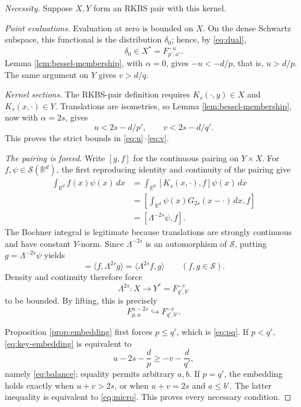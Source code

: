 \documentclass[11pt]{article}
\newcommand{\R}{\mathbb R}
\newcommand{\Sch}{\mathcal S}
\newcommand{\Fsp}[3]{F^{#1}_{#2,#3}}
\newcommand{\Lambdaop}{\Lambda}
\newcommand{\ip}[2]{\langle #1,#2\rangle}
\begin{document}
\begin{proof}[Necessity]
Suppose $X,Y$ form an RKBS pair with this kernel.

\emph{Point evaluations.}
Evaluation at zero is bounded on $X$.  On the dense Schwartz subspace,
this functional is the distribution $\delta_0$; hence, by
\eqref{eq:dual},
\[
  \delta_0\in X^*=\Fsp{-u}{p'}{a'}.
\]
Lemma \ref{lem:bessel-membership}, with $\alpha=0$, gives
$-u<-d/p$, that is, $u>d/p$.  The same argument on $Y$ gives
$v>d/q$.

\emph{Kernel sections.}
The RKBS-pair definition requires
$K_s(\cdot,y)\in X$ and $K_s(x,\cdot)\in Y$.  Translations are
isometries, so Lemma \ref{lem:bessel-membership}, now with
$\alpha=2s$, gives
\[
  u<2s-d/p',
  \qquad v<2s-d/q'.
\]
This proves the strict bounds in \eqref{eq:u}--\eqref{eq:v}.

\emph{The pairing is forced.}
Write $[g,f]$ for the continuous pairing on $Y\times X$.  For
$f,\psi\in\Sch(\R^d)$, the first reproducing identity and continuity of
the pairing give
\begin{align*}
  \int_{\R^d} f(x)\psi(x)\,dx
  &=\int_{\R^d}[K_s(x,\cdot),f]\psi(x)\,dx\\
  &=\left[\int_{\R^d}\psi(x)G_{2s}(x-\cdot)\,dx,f\right]\\
  &=[\Lambdaop^{-2s}\psi,f].
\end{align*}
The Bochner integral is legitimate because translations are strongly
continuous and have constant $Y$-norm.  Since
$\Lambdaop^{-2s}$ is an automorphism of $\Sch$, putting
$g=\Lambdaop^{-2s}\psi$ yields
\begin{equation}
  [g,f]=\ip{f}{\Lambdaop^{2s}g}
  =\ip{\Lambdaop^{2s}f}{g}
  \qquad(f,g\in\Sch).
  \label{eq:forced-pairing}
\end{equation}
Density and continuity therefore force
\[
  \Lambdaop^{2s}:X\longrightarrow Y^*
  =\Fsp{-v}{q'}{b'}
\]
to be bounded.  By lifting, this is precisely
\begin{equation}
  \Fsp{u-2s}{p}{a}\hookrightarrow
  \Fsp{-v}{q'}{b'}.
  \label{eq:key-embedding}
\end{equation}

Proposition \ref{prop:embedding} first forces $p\leq q'$, which is
\eqref{eq:pq}.  If $p<q'$, \eqref{eq:key-embedding} is equivalent to
\[
  u-2s-\frac dp\geq -v-\frac d{q'},
\]
namely \eqref{eq:balance}; equality permits arbitrary $a,b$.
If $p=q'$, the embedding holds exactly when $u+v>2s$, or when
$u+v=2s$ and $a\leq b'$.  The latter inequality is equivalent to
\eqref{eq:micro}.  This proves every necessary condition.
\end{proof}
\end{document}
